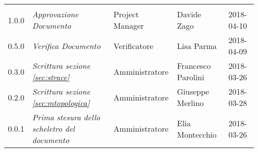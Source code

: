 \newpage 
\section*{}
\begin{table}[H]
	\centering
	\begin{tabular}{C{2cm}|C{4cm}|C{3cm}|C{3cm}|R{2cm}}
		
		 & & & & \\
		
		
			1.0.0  & \emph{Approvazione Documento} & Project Manager & Davide Zago &  2018-04-10 \\
		\hline
		
		0.5.0  & \emph{Verifica Documento} & Verificatore & Lisa Parma &  2018-04-09 \\
		\hline
		
		0.3.0 & \emph{Scrittura sezione \ref{sec:strace}} & Amministratore & Francesco Parolini &  2018-03-26 \\
		\hline
		
		0.2.0 & \emph{Scrittura sezione \ref{sec:mtopologica}} & Amministratore & Giuseppe Merlino &  2018-03-28 \\
		\hline
		
		
		0.0.1 & \emph{Prima stesura dello scheletro del documento} & Amministratore & Elia Montecchio &  2018-03-26 \\
		\hline
		
	\end{tabular}
	
\end{table}


\clearpage